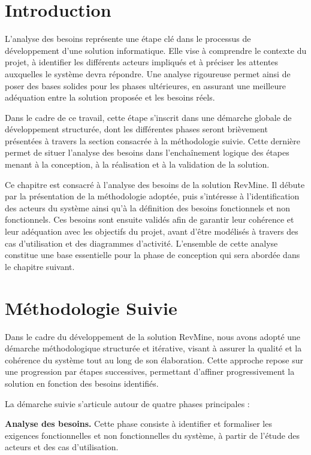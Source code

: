 \section{Introduction}

L’analyse des besoins représente une étape clé dans le processus de développement d’une solution informatique. Elle vise à comprendre le contexte du projet, à identifier les différents acteurs impliqués et à préciser les attentes auxquelles le système devra répondre. Une analyse rigoureuse permet ainsi de poser des bases solides pour les phases ultérieures, en assurant une meilleure adéquation entre la solution proposée et les besoins réels.

Dans le cadre de ce travail, cette étape s’inscrit dans une démarche globale de développement structurée, dont les différentes phases seront brièvement présentées à travers la section consacrée à la méthodologie suivie. Cette dernière permet de situer l’analyse des besoins dans l’enchaînement logique des étapes menant à la conception, à la réalisation et à la validation de la solution.

Ce chapitre est consacré à l’analyse des besoins de la solution RevMine. Il débute par la présentation de la méthodologie adoptée, puis s’intéresse à l’identification des acteurs du système ainsi qu’à la définition des besoins fonctionnels et non fonctionnels. Ces besoins sont ensuite validés afin de garantir leur cohérence et leur adéquation avec les objectifs du projet, avant d’être modélisés à travers des cas d’utilisation et des diagrammes d’activité. L’ensemble de cette analyse constitue une base essentielle pour la phase de conception qui sera abordée dans le chapitre suivant.

\section{Méthodologie Suivie}

Dans le cadre du développement de la solution RevMine, nous avons adopté une démarche méthodologique structurée et itérative, visant à assurer la qualité et la cohérence du système tout au long de son élaboration. Cette approche repose sur une progression par étapes successives, permettant d’affiner progressivement la solution en fonction des besoins identifiés.

La démarche suivie s’articule autour de quatre phases principales :

\textbf{Analyse des besoins.} Cette phase consiste à identifier et formaliser les exigences fonctionnelles et non fonctionnelles du système, à partir de l’étude des acteurs et des cas d’utilisation.

